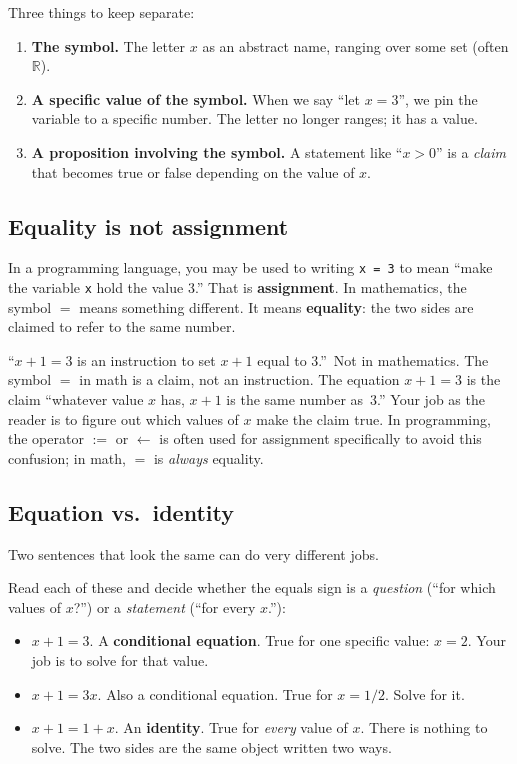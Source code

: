 Three things to keep separate:

\begin{enumerate}
  \item \textbf{The symbol.} The letter $x$ as an abstract name, ranging over some set (often $\mathbb{R}$).
  \item \textbf{A specific value of the symbol.} When we say ``let $x = 3$'', we pin the variable to a specific number. The letter no longer ranges; it has a value.
  \item \textbf{A proposition involving the symbol.} A statement like ``$x > 0$'' is a \emph{claim} that becomes true or false depending on the value of $x$.
\end{enumerate}

\subsection*{Equality is not assignment}

In a programming language, you may be used to writing \texttt{x = 3} to mean ``make the variable \texttt{x} hold the value $3$.'' That is \textbf{assignment}. In mathematics, the symbol $=$ means something different. It means \textbf{equality}: the two sides are claimed to refer to the same number.

\begin{mistake}
``$x + 1 = 3$ is an instruction to set $x + 1$ equal to $3$.''\ Not in mathematics. The symbol $=$ in math is a claim, not an instruction. The equation $x + 1 = 3$ is the claim ``whatever value $x$ has, $x + 1$ is the same number as~$3$.'' Your job as the reader is to figure out which values of $x$ make the claim true. In programming, the operator \(:=\) or \(\leftarrow\) is often used for assignment specifically to avoid this confusion; in math, $=$ is \emph{always} equality.
\end{mistake}

\subsection*{Equation vs.\ identity}

Two sentences that look the same can do very different jobs.

\begin{trick}
Read each of these and decide whether the equals sign is a \emph{question} (``for which values of $x$?'') or a \emph{statement} (``for every $x$.''):
\begin{itemize}
  \item $x + 1 = 3$. A \textbf{conditional equation}. True for one specific value: $x = 2$. Your job is to solve for that value.
  \item $x + 1 = 3x$. Also a conditional equation. True for $x = 1/2$. Solve for it.
  \item $x + 1 = 1 + x$. An \textbf{identity}. True for \emph{every} value of $x$. There is nothing to solve. The two sides are the same object written two ways.
\end{itemize}
\end{trick}

